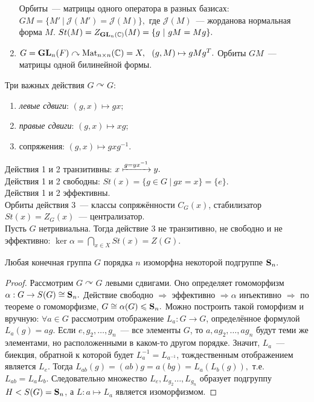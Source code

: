 \begin{exmpls}
\begin{enumerate}
                Орбиты~--- матрицы одного оператора в разных базисах: ${GM = \{M' \ | \ \mathcal{J}(M') = \mathcal{J}(M)\},}$ где $\mathcal{J}(M)$~--- жорданова нормальная форма $M$.\n
                ${St(M) = Z_{\GL_n(\complex)}(M) = \{g \ | \ gM = Mg\}.}$
                \item ${G = \mathbf{GL}_n(F) \curvearrowright \mathrm{Mat}_{n \times n}(\mathbb{C}) = X, \ \ (g,M) \mapsto gMg^T.}$\n
                Орбиты $GM$~--- матрицы одной билинейной формы.
            \end{enumerate}
            Три важных действия ${G \curvearrowright G}$:
            \begin{enumerate}
                \setlength\itemsep{0.1em}
                \item \textit{левые сдвиги}: ${(g,x) \mapsto gx;}$
                \item \textit{правые сдвиги}: ${(g,x) \mapsto xg;}$
                \item сопряжения: ${(g,x) \mapsto gxg^{-1}.}$
            \end{enumerate}
            Действия 1 и 2 транзитивны: ${x \xmapsto{g=yx^{-1}}y.}$\\
            Действия 1 и 2 свободны: ${St(x) = \{g \in G \ | \ gx = x\} = \{e\}.}$\\
            Действия 1 и 2 эффективны.\\
            Орбиты действия 3~--- классы сопряжённости $C_G(x)$, стабилизатор ${St(x) = Z_G(x)}$~--- централизатор.\\
            Пусть $G$ нетривиальна. Тогда действие 3 не транзитивно, не свободно и не эффективно: ${\ker \alpha = \displaystyle\bigcap_{x \in X} St(x) = Z(G).}$
        \end{exmpls}
        \begin{theorem*}
		Любая конечная группа $G$ порядка $n$ изоморфна некоторой подгруппе $\mathbf{S}_n.$
	\end{theorem*}
	\begin{proof}
            Рассмотрим ${G \curvearrowright G}$ левыми сдвигами. Оно определяет гомоморфизм ${\alpha : G \rightarrow S(G) \cong \mathbf{S}_n.}$ Действие свободно $\Rightarrow$ эффективно ${\Rightarrow \alpha}$ инъективно $\Rightarrow$ по теореме о гомоморфизме, ${G \cong \alpha(G) \leqslant \mathbf{S}_n.}$\n
		  Можно построить такой гоморфизм и вручную: ${\forall {a \in G}}$ рассмотрим отображение ${L_a : G \rightarrow G}$, определённое формулой ${L_a(g) = ag.}$\n
          Если $e, g_2,\ldots,g_n$~--- все элементы $G$, то $a, ag_2,\ldots,ag_n$ будут теми же элементами, но расположенными в каком-то другом порядке. Значит, $L_a$~--- биекция, обратной к которой будет $L_a^{-1} = L_{a^{-1}}$, тождественным отображением является $L_e$. Тогда $L_{ab}(g) = (ab)g = a(bg) = L_a(L_b(g)),$ т.е. $L_{ab} = L_a L_b.$ Следовательно множество $L_e, L_{g_2}\ldots,L_{g_n}$ образует подгруппу ${H < S(G) = \mathbf{S}_n}$, а ${L : a \mapsto L_a}$ является изоморфизмом.
	\end{proof}
